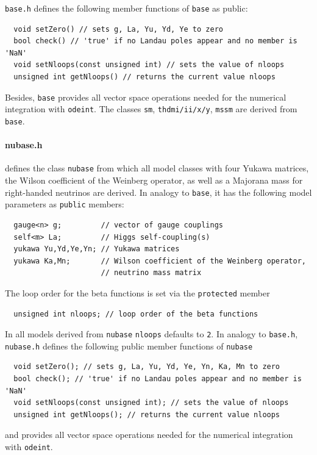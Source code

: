 \documentclass[11pt,a4paper]{article}
\begin{document}
\texttt{base.h} defines the following member functions of \texttt{base} as public:
\begin{lstlisting}
  void setZero() // sets g, La, Yu, Yd, Ye to zero
  bool check() // 'true' if no Landau poles appear and no member is 'NaN'
  void setNloops(const unsigned int) // sets the value of nloops
  unsigned int getNloops() // returns the current value nloops
\end{lstlisting}
Besides, \texttt{base} provides all vector space operations needed for the numerical integration with \texttt{odeint}. The classes \texttt{sm}, \texttt{thdmi/ii/x/y}, \texttt{mssm} are derived from \texttt{base}.

\paragraph{nubase.h}
defines the class \texttt{nubase} from which all model classes with four Yukawa matrices, the Wilson coefficient of the Weinberg operator, as well as a Majorana mass for right-handed neutrinos are derived.
In analogy to \texttt{base}, it has the following model parameters as \texttt{public} members:
\begin{lstlisting}
  gauge<n> g;         // vector of gauge couplings
  self<m> La;         // Higgs self-coupling(s)
  yukawa Yu,Yd,Ye,Yn; // Yukawa matrices
  yukawa Ka,Mn;       // Wilson coefficient of the Weinberg operator,
                      // neutrino mass matrix   
\end{lstlisting}
The loop order for the beta functions is set via the \texttt{protected} member
\begin{lstlisting}
  unsigned int nloops; // loop order of the beta functions
\end{lstlisting}
In all models derived from \texttt{nubase} \texttt{nloops} defaults to \texttt{2}.
In analogy to \texttt{base.h}, \texttt{nubase.h} defines the following public member functions of \texttt{nubase}
\begin{lstlisting}
  void setZero(); // sets g, La, Yu, Yd, Ye, Yn, Ka, Mn to zero
  bool check(); // 'true' if no Landau poles appear and no member is 'NaN'
  void setNloops(const unsigned int); // sets the value of nloops
  unsigned int getNloops(); // returns the current value nloops
\end{lstlisting}
and provides all vector space operations needed for the numerical integration with \texttt{odeint}.
\end{document}
